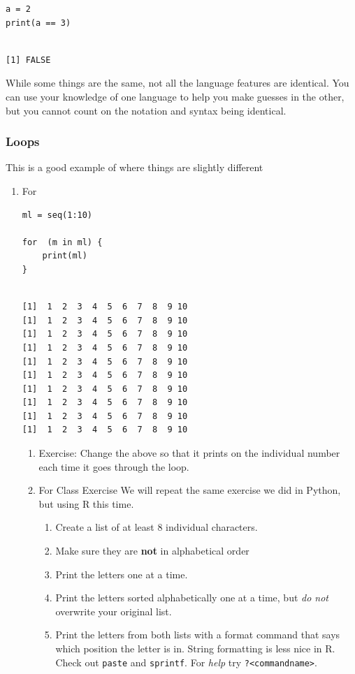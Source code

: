 \documentclass{article}
\begin{document}
\begin{verbatim}
a = 2
print(a == 3)
\end{verbatim}

\begin{verbatim}

[1] FALSE
\end{verbatim}
While some things are the same, not all the language features are identical. You can use your knowledge of one language to help you make guesses in the other, but you cannot count on the notation and syntax being identical.
\subsubsection{Loops}
\label{sec:org71e590f}
This is a good example of where things are slightly different
\begin{enumerate}
\item For
\label{sec:orga94b23f}
\begin{verbatim}
ml = seq(1:10)

for  (m in ml) {
    print(ml)
}
\end{verbatim}

\begin{verbatim}

[1]  1  2  3  4  5  6  7  8  9 10
[1]  1  2  3  4  5  6  7  8  9 10
[1]  1  2  3  4  5  6  7  8  9 10
[1]  1  2  3  4  5  6  7  8  9 10
[1]  1  2  3  4  5  6  7  8  9 10
[1]  1  2  3  4  5  6  7  8  9 10
[1]  1  2  3  4  5  6  7  8  9 10
[1]  1  2  3  4  5  6  7  8  9 10
[1]  1  2  3  4  5  6  7  8  9 10
[1]  1  2  3  4  5  6  7  8  9 10
\end{verbatim}
\begin{enumerate}
\item Exercise:
\label{sec:org55e8aaa}
Change the above so that it prints on the individual number each time it goes through the loop. 

\item For Class Exercise
\label{sec:org0a532a4}
We will repeat the same exercise we did in Python, but using R this time. 
\begin{enumerate}
\item Create a list of at least 8 individual characters.
\item Make sure they are \textbf{\textbf{not}} in alphabetical order
\item Print the letters one at a time.
\item Print the letters sorted alphabetically one at a time, but \emph{do not} overwrite your original list.
\item Print the letters from both lists with a format command that says which position the letter is in. String formatting is less nice in R. Check out \texttt{paste} and \texttt{sprintf}. For \emph{help} try \texttt{?<commandname>}.
\end{enumerate}


\end{enumerate}
\end{enumerate}
\end{document}
